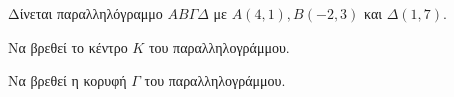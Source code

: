 Δίνεται παραλληλόγραμμο $ AB\varGamma\varDelta $ με $ A(4,1),B(-2,3) $ και $\varDelta(1,7)$.
\begin{alist}
\item Να βρεθεί το κέντρο $K$ του παραλληλογράμμου.
\item Να βρεθεί η κορυφή $ \varGamma $ του παραλληλογράμμου.
\end{alist}
